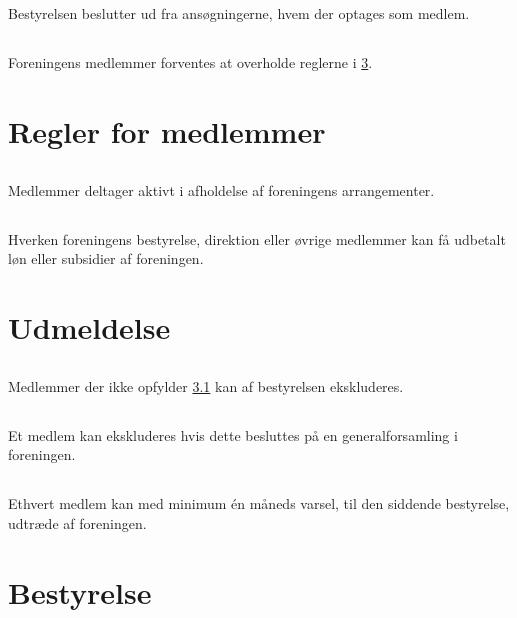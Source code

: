 \documentclass[danish,a4paper,twocolumn,oneside,article]{memoir}
\begin{document}
\section{} Bestyrelsen beslutter ud fra ansøgningerne, hvem der optages som medlem.

\section{} Foreningens medlemmer forventes at overholde reglerne i \ref{p:rules}.

\chapter{Regler for medlemmer}\label{p:rules}

\section{}\label{s:active} Medlemmer deltager aktivt i afholdelse af foreningens arrangementer.

\section{} Hverken foreningens bestyrelse, direktion eller øvrige medlemmer kan få udbetalt løn eller
subsidier af foreningen.


\chapter{Udmeldelse}

\section{} Medlemmer der ikke opfylder \ref{s:active} kan af bestyrelsen ekskluderes.

\section{}\label{s:gfexclusion} Et medlem kan ekskluderes hvis dette besluttes på en generalforsamling i foreningen.

\section{} Ethvert medlem kan med minimum én måneds varsel, til den siddende bestyrelse, udtræde af foreningen.


\chapter{Bestyrelse}
\end{document}
